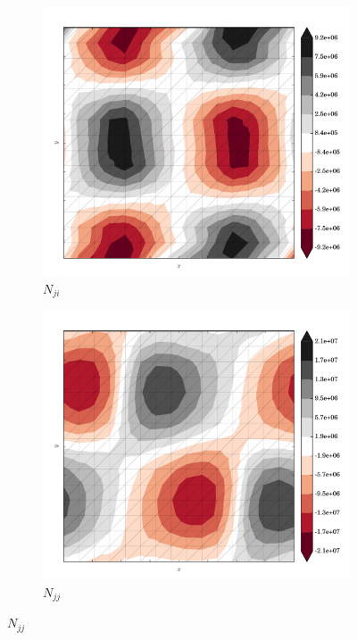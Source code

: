 \begin{figure}
  \begin{subfigure}[b]{0.3\linewidth}
    \includegraphics[width=\linewidth]{images/stress_balance/BP/N_ji.pdf}
  \caption{$N_{ji}$}
  \label{bp_N_ji}
  \end{subfigure}
  \begin{subfigure}[b]{0.3\linewidth}
    \includegraphics[width=\linewidth]{images/stress_balance/BP/N_jj.pdf}
  \caption{$N_{jj}$}
  \label{bp_N_jj}
  \end{subfigure}

\end{figure}
